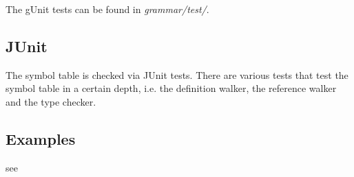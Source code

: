 The gUnit tests can be found in \emph{grammar/test/}.


\subsection{JUnit}

The symbol table is checked via JUnit tests. There are various tests that 
test the symbol table in a certain depth, i.e. the definition walker, the
reference walker and the type checker.

\subsection{Examples}
see 
